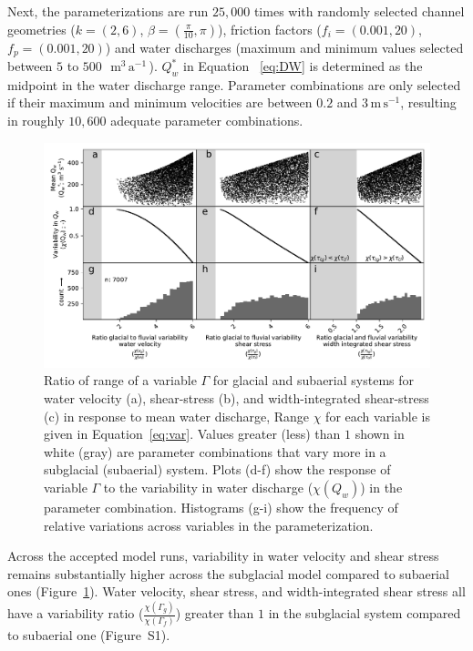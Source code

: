 \documentclass[11pt]{article}
\newcommand{\mmma}{$\,\mathrm{m^3\, a^{-1}}$\,}
\newcommand{\unit}[1]{$\mathrm{#1}$}
\begin{document}
\begin{spacing}{1}
  Next, the parameterizations are run $25,000$ times with randomly selected channel geometries ($k=(2,6)$, $\beta=(\frac{\pi}{10},\pi)$), friction factors ($f_i=(0.001,20)$, $f_p=(0.001,20)$) and water discharges (maximum and minimum values selected between $5$ to $500$ \,\mmma). $Q_w^*$ in Equation ~\ref{eq:DW} is determined as the midpoint in the water discharge range. Parameter combinations are only selected if their maximum and minimum velocities are between $0.2$ and $3$\,\unit{m}\,\unit{s}$^{-1}$, resulting in roughly $10,600$ adequate parameter combinations. 
  
  
  \begin{center}
    \begin{figure}[H]
      \includegraphics[width=0.7\linewidth]{multi_run.pdf}
      \caption{Ratio of range of a variable $\Gamma$ for glacial and subaerial systems for water velocity  (a), shear-stress (b), and  width-integrated shear-stress (c) in response to mean water discharge,
        Range  $\chi$ for each variable is given in Equation~\ref{eq:var}. Values greater (less) than $1$ shown in white (gray) are parameter combinations that vary more in a subglacial (subaerial) system. Plots (d-f) show the response of variable $\Gamma$ to the variability in water discharge ($\chi(Q_w)$) in the parameter combination. 
        Histograms (g-i) show the frequency of relative variations across variables in the parameterization.}
      \label{fig:range}
    \end{figure}
  \end{center}
  
  Across the accepted model runs, variability in water velocity and shear stress remains substantially higher across the subglacial model compared to subaerial ones (Figure~\ref{fig:range}).
  Water velocity, shear stress, and width-integrated shear stress all have a variability ratio ($\frac{\chi(\Gamma_{g})}{\chi(\Gamma_f)}$) greater than $1$ in the subglacial  system compared to subaerial one (Figure~S1).
  

\end{spacing}
\end{document}
